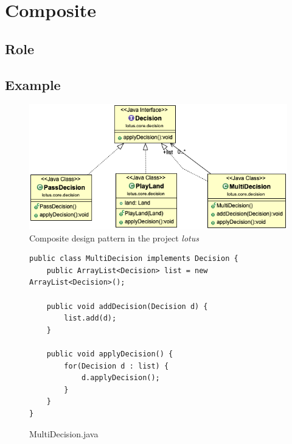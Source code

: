\section{Composite}


\subsection*{Role}


\subsection*{Example}

\begin{figure}[htb]
    \centering
    \includegraphics[width=0.8\columnwidth]{images/composite.png}
    \caption{Composite design pattern in the project \textit{lotus}}
    \label{fig:abstract_factory}
\end{figure}


\begin{figure}[!tbp]
\centering
\lstset{language=Java, stepnumber=1, showspaces=false, showstringspaces=false,breaklines=true}
\begin{lstlisting}
public class MultiDecision implements Decision {
	public ArrayList<Decision> list = new ArrayList<Decision>();
	
	public void addDecision(Decision d) {
		list.add(d);
	}
 
	public void applyDecision() {
		for(Decision d : list) {
			d.applyDecision();
		}
	}
}
\end{lstlisting}
\caption{MultiDecision.java}
\label{}
\end{figure}


